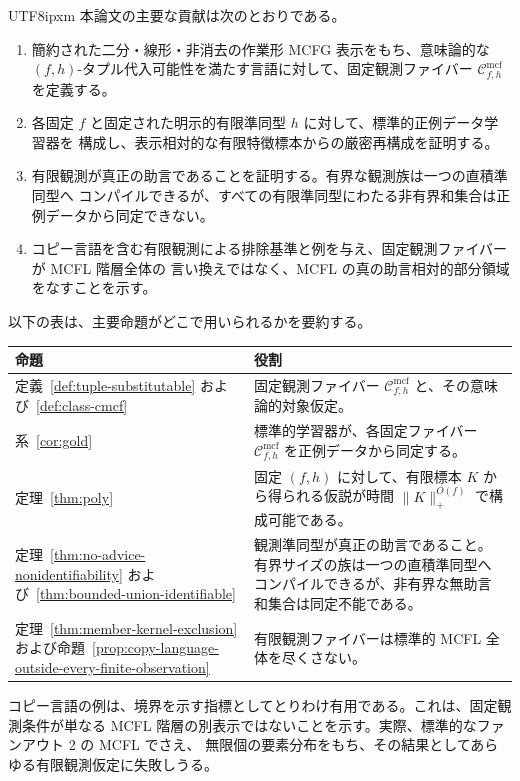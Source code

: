 \documentclass[10pt,a4paper]{article}
\theoremstyle{remark}
\newcommand{\Cmcf}[2]{\mathcal{C}^{\mathrm{mcf}}_{#1,#2}}
\begin{document}
\begin{CJK}{UTF8}{ipxm}
本論文の主要な貢献は次のとおりである。
\begin{enumerate}[label=(\roman*),leftmargin=*]
\item 簡約された二分・線形・非消去の作業形 MCFG 表示をもち、意味論的な
\((f,h)\)-タプル代入可能性を満たす言語に対して、固定観測ファイバー
\(\Cmcf{f}{h}\) を定義する。

\item 各固定 \(f\) と固定された明示的有限準同型 \(h\) に対して、標準的正例データ学習器を
構成し、表示相対的な有限特徴標本からの厳密再構成を証明する。

\item 有限観測が真正の助言であることを証明する。有界な観測族は一つの直積準同型へ
コンパイルできるが、すべての有限準同型にわたる非有界和集合は正例データから同定できない。

\item コピー言語を含む有限観測による排除基準と例を与え、固定観測ファイバーが MCFL 階層全体の
言い換えではなく、MCFL の真の助言相対的部分領域をなすことを示す。
\end{enumerate}

以下の表は、主要命題がどこで用いられるかを要約する。
\begin{center}
\begin{tabular}{|p{}|p{}|}
\hline
命題 & 役割 \\
\hline
定義~\ref{def:tuple-substitutable} および~\ref{def:class-cmcf} & 固定観測ファイバー \(\Cmcf{f}{h}\) と、その意味論的対象仮定。 \\
\hline
系~\ref{cor:gold} & 標準的学習器が、各固定ファイバー \(\Cmcf{f}{h}\) を正例データから同定する。 \\
\hline
定理~\ref{thm:poly} & 固定 \((f,h)\) に対して、有限標本 \(K\) から得られる仮説が時間 \(\|K\|_+^{O(f)}\) で構成可能である。 \\
\hline
定理~\ref{thm:no-advice-nonidentifiability} および~\ref{thm:bounded-union-identifiable} & 観測準同型が真正の助言であること。有界サイズの族は一つの直積準同型へコンパイルできるが、非有界な無助言和集合は同定不能である。 \\
\hline
定理~\ref{thm:member-kernel-exclusion} および命題~\ref{prop:copy-language-outside-every-finite-observation} & 有限観測ファイバーは標準的 MCFL 全体を尽くさない。 \\
\hline
\end{tabular}
\end{center}

コピー言語の例は、境界を示す指標としてとりわけ有用である。これは、固定観測条件が単なる
MCFL 階層の別表示ではないことを示す。実際、標準的なファンアウト 2 の MCFL でさえ、
無限個の要素分布をもち、その結果としてあらゆる有限観測仮定に失敗しうる。


\end{CJK}
\end{document}
